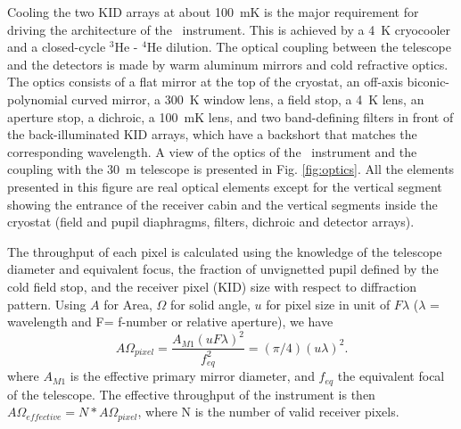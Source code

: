 Cooling the two KID arrays at about 100~mK is the major requirement for
driving the architecture of the \NIKA\ instrument. This is achieved by a 4~K
cryocooler and a closed-cycle $^3$He - $^4$He dilution.  The optical coupling
between the telescope and the detectors is made by warm aluminum mirrors and
cold refractive optics.  The optics consists of a flat mirror at the
top of the cryostat, an off-axis biconic-polynomial curved mirror, a 300~K
window lens, a field stop, a 4~K lens, an aperture stop, a dichroic, a 100~mK
lens, and two band-defining filters in front of the back-illuminated KID
arrays, which have a backshort that matches the corresponding wavelength.  A view
of the optics of the \NIKA\ instrument and the coupling with the 30~m
telescope is presented in Fig. \ref{fig:optics}.  All the elements presented
in this figure are real optical elements except for the vertical segment
showing the entrance of the receiver cabin and the vertical segments inside
the cryostat (field and pupil diaphragms, filters, dichroic and detector
arrays). 

The throughput of each pixel is calculated using the knowledge of the telescope diameter and equivalent focus, the fraction of unvignetted pupil defined by the cold field stop, and the receiver pixel (KID) size with respect to diffraction pattern. Using $A$ for Area, $\Omega$ for solid angle, $u$ for pixel size in unit of $F \lambda$ ($\lambda$ = wavelength and F= f-number or relative aperture), we have
$$
A\Omega_{pixel} = \frac{A_{M1} (u F \lambda)^2}{f^2_{eq}} = (\pi/4)  (u \lambda)^2 .
$$
where $A_{M1}$ is the effective primary mirror diameter, and $f_{eq}$ the equivalent focal of the telescope.
The effective throughput of the instrument is then $A \Omega_{effective} = N*A\Omega_{pixel}$, where N is the number of valid receiver pixels. 


